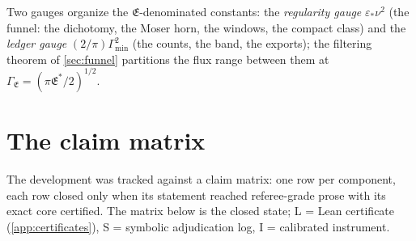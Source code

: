 \documentclass[11pt,letterpaper]{amsart}
\theoremstyle{definition}
\theoremstyle{remark}
\begin{document}
Two gauges organize the $\mathfrak{E}$-denominated constants: the
\emph{regularity gauge} $\varepsilon_*\nu^2$ (the funnel: the dichotomy, the
Moser horn, the windows, the compact class) and the \emph{ledger gauge}
$(2/\pi)\Gamma_{\min}^2$ (the counts, the band, the exports); the filtering
theorem of \cref{sec:funnel} partitions the flux range between them at
$\Gamma_{\mathfrak{E}}=(\pi\mathfrak{E}^*/2)^{1/2}$.

\section{The claim matrix}\label{app:matrix}

The development was tracked against a claim matrix: one row per component, each row
closed only when its statement reached referee-grade prose with its exact core
certified. The matrix below is the closed state; L = Lean certificate
(\cref{app:certificates}), S = symbolic adjudication log, I = calibrated instrument.
\end{document}
